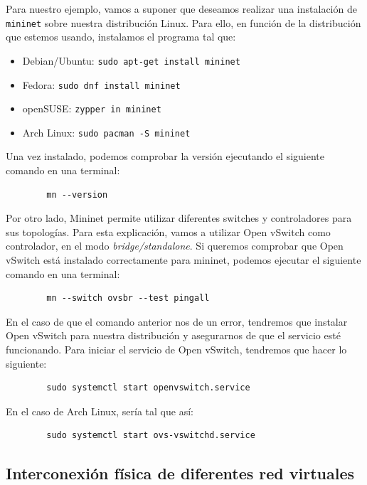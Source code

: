 \documentclass[12pt]{article}
\begin{document}
	\pagebreak

	\noindent Para nuestro ejemplo, vamos a suponer que deseamos realizar una instalación de \texttt{mininet} sobre nuestra distribución Linux. Para ello, en función de la distribución que estemos usando, instalamos el programa tal que:
	
	\begin{itemize}
		\item Debian/Ubuntu: \texttt{sudo apt-get install mininet}
		\item Fedora: \texttt{sudo dnf install mininet}
		\item openSUSE: \texttt{zypper in mininet}
		\item Arch Linux: \texttt{sudo pacman -S mininet}
	\end{itemize}

	\noindent Una vez instalado, podemos comprobar la versión ejecutando el siguiente comando en una terminal:
	\begin{verbatim}
		mn --version
	\end{verbatim}

	\noindent Por otro lado, Mininet permite utilizar diferentes switches y controladores para sus topologías. Para esta explicación, vamos a utilizar Open vSwitch como controlador, en el modo \textit{bridge/standalone}. Si queremos comprobar que Open vSwitch está instalado correctamente para mininet, podemos ejecutar el siguiente comando en una terminal:
	\begin{verbatim}
		mn --switch ovsbr --test pingall
	\end{verbatim}

	\noindent En el caso de que el comando anterior nos de un error, tendremos que instalar Open vSwitch para nuestra distribución y asegurarnos de que el servicio esté funcionando. Para iniciar el servicio de Open vSwitch, tendremos que hacer lo siguiente:
	\begin{verbatim}
		sudo systemctl start openvswitch.service
	\end{verbatim}

	\noindent En el caso de Arch Linux, sería tal que así:
	\begin{verbatim}
		sudo systemctl start ovs-vswitchd.service
	\end{verbatim}

	
	\subsection{Interconexión física de diferentes red virtuales}
\end{document}
